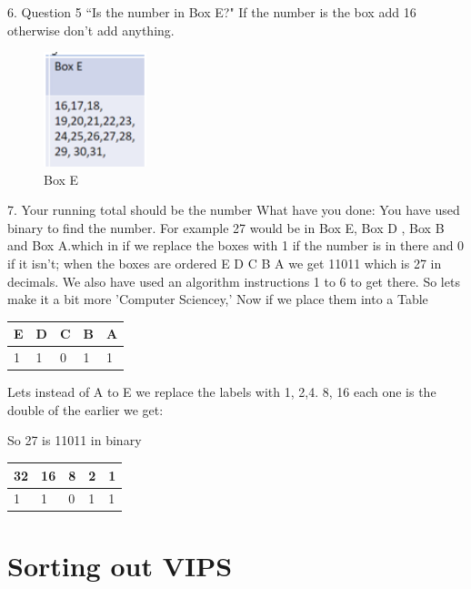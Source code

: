 6.	Question 5 “Is the number in Box E?" If the number is the box add 16 otherwise don't add anything.
\begin{figure}
    \centering
    \includegraphics[width=3cm]{chapters/chapterCT1/figures/BoxE.png}
    \caption{Box E}
    \label{fig:Box E}
\end{figure}
7.	Your running total should be the number
What have you done: You have used binary to find the number. For example 27 would be in Box E, Box D , Box B and Box A.which in if we replace the boxes with 1 if the number is in there and 0 if it isn’t; when the boxes are ordered E D C B A we get 11011 which is 27 in decimals. We also have used an algorithm instructions 1 to 6 to get there.
\newline
So lets make it a bit more 'Computer Sciencey,'
Now if we place them into a Table 
\begin{tabular}{lllll} \hline
E & D & C & B & A	 	 \\ \hline
1  & 1  & 0 &  1 & 1\\ \hline

\end{tabular}

Lets instead of A to E we replace the labels with 1, 2,4. 8, 16 each one is the double of the earlier we get:


So 27 is 11011 in binary
\begin{tabular}{lllll} \hline
32 & 16 & 8 & 2 & 1 	 \\ \hline
1  & 1  & 0 &  1 & 1\\ \hline

\end{tabular}

\section{Sorting out VIPS}